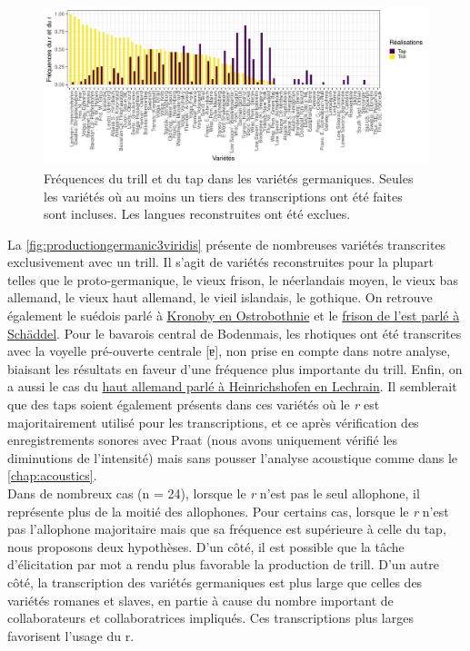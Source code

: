 \begin{figure}
	\centering
	\includegraphics[width=1\linewidth]{substance/images/freq_trill_germanic2}
	\caption[Fréquences du trill et du tap dans les variétés germaniques]{Fréquences du trill et du tap dans les variétés germaniques. Seules les variétés où au moins un tiers des transcriptions ont été faites sont incluses. Les langues reconstruites ont été exclues.}
	\label{fig:freqtrillgermanic}
\end{figure}

La \autoref{fig:productiongermanic3viridis} présente de nombreuses variétés transcrites exclusivement avec un trill. Il s'agit de variétés reconstruites pour la plupart telles que le proto-germanique, le vieux frison, le néerlandais moyen, le vieux bas allemand, le vieux haut allemand, le  vieil islandais, le gothique.
On retrouve également le suédois parlé à \href{https://soundcomparisons.com/#/en/Germanic/language/Gmc_N_Swe_Fin_Ostrobothnia_Kronoby_Dl}{Kronoby en Ostrobothnie} et le \href{https://soundcomparisons.com/#/en/Germanic/language/Gmc_N_Swe_Fin_Ostrobothnia_Kronoby_Dl}{frison de l'est parlé à Schäddel}.
Pour le bavarois central de Bodenmais, les rhotiques ont été transcrites avec la voyelle pré-ouverte centrale [ɐ], non prise en compte dans notre analyse, biaisant les résultats en faveur d'une fréquence plus importante du trill.
Enfin, on a aussi le cas du \href{https://soundcomparisons.com/#/en/Germanic/language/Gmc_W_GHgh_Alm_Lech_Heinrichshofen_Dl}{haut allemand parlé à Heinrichshofen en Lechrain}. Il semblerait que des taps soient également présents dans ces variétés où le \textit{r} est majoritairement utilisé pour les transcriptions, et ce après vérification des enregistrements sonores avec Praat (nous avons uniquement vérifié les diminutions de l'intensité) mais sans pousser l'analyse acoustique comme dans le \autoref{chap:acoustics}.\\

Dans de nombreux cas (n = 24), lorsque le \textit{r} n'est pas le seul allophone, il représente plus de la moitié des allophones. Pour certains cas, lorsque le \textit{r} n'est pas l'allophone majoritaire mais que sa fréquence est supérieure à celle du tap, nous proposons deux hypothèses. D'un côté, il est possible que la tâche d'élicitation par mot a rendu plus favorable la production de trill. D'un autre côté, la transcription des variétés germaniques est plus large que celles des variétés romanes et slaves, en partie à cause du nombre important de collaborateurs et collaboratrices impliqués. Ces transcriptions plus larges favorisent l'usage du r.\\

